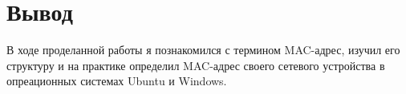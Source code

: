 \chapter{Вывод}
\label{ch:chap3}

В ходе проделанной работы я познакомился с термином MAC-адрес, изучил его структуру и на практике определил MAC-адрес своего сетевого
устройства в опреационных системах Ubuntu и Windows.

\endinput